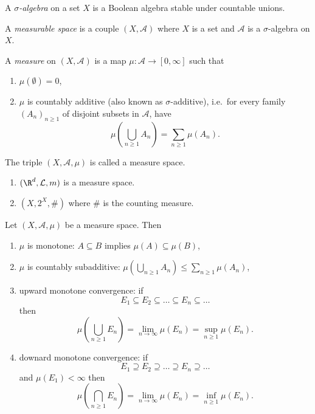 \documentclass[a4paper]{article}
\begin{document}
\begin{definition}
  A \emph{\(\sigma\)-algebra} on a set \(X\) is a Boolean algebra stable under countable unions.
\end{definition}

\begin{definition}
  A \emph{measurable space} is a couple \((X, \mathcal A)\) where \(X\) is a set and \(\mathcal A\) is a \(\sigma\)-algebra on \(X\).
\end{definition}

\begin{definition}[measure]
  A \emph{measure} on \((X, \mathcal A)\) is a map \(\mu: \mathcal A \to [0, \infty]\) such that
  \begin{enumerate}
  \item \(\mu(\emptyset) = 0\),
  \item \(\mu\) is countably additive (also known as \(\sigma\)-additive), i.e.\ for every family \((A_n)_{n \geq 1}\) of disjoint subsets in \(\mathcal A\), have
    \[
      \mu (\bigcup_{n \geq 1} A_n) = \sum_{n \geq 1} \mu(A_n).
    \]
  \end{enumerate}

  The triple \((X, \mathcal A, \mu)\) is called a measure space.
\end{definition}

\begin{eg}\leavevmode
  \begin{enumerate}
  \item \((\R^d, \mathcal L, m)\) is a measure space.
  \item \((X, 2^X, \#)\) where \(\#\) is the counting measure.
  \end{enumerate}
\end{eg}

\begin{proposition}
  Let \((X, \mathcal A, \mu)\) be a measure space. Then
  \begin{enumerate}
  \item \(\mu\) is monotone: \(A \subseteq B\) implies \(\mu(A) \subseteq \mu(B)\),
  \item \(\mu\) is countably subadditive: \(\mu (\bigcup_{n \geq 1} A_n) \leq \sum_{n \geq 1} \mu(A_n)\),
  \item upward monotone convergence: if
    \[
      E_1 \subseteq E_2 \subseteq \dots \subseteq E_n \subseteq \dots
    \]
    then
    \[
      \mu (\bigcup_{n \geq 1} E_n) = \lim_{n \to \infty} \mu(E_n) = \sup_{n \geq 1} \mu(E_n).
    \]
  \item downard monotone convergence: if
    \[
      E_1 \supseteq E_2 \supseteq \dots \supseteq E_n \supseteq \dots
    \]
    and \(\mu(E_1) < \infty\) then
    \[
      \mu (\bigcap_{n \geq 1} E_n) = \lim_{n \to \infty} \mu(E_n) = \inf_{n \geq 1} \mu(E_n).
    \]
  \end{enumerate}
\end{proposition}
\end{document}
